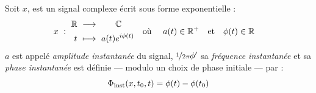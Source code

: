\begin{definition} \label{def:param_instant}
	Soit $x$, est un signal complexe écrit sous forme exponentielle :
	\begin{align}
		x\ &:\ \begin{aligned}\mathbb{R}\ &\longrightarrow\qquad \mathbb{C} \\
			t\ &\longmapsto\ a(t)e^{i\phi(t)}
		\end{aligned}  &  \text{où }\quad a(t)\in\mathbb{R}^+\quad &\text{et}\quad \phi(t)\in\mathbb{R}
	\end{align}
	$a$ est appelé \emph{amplitude instantanée} du signal, $\nicefrac{1}{2\pi}\phi'$ sa \emph{fréquence instantanée} et sa \emph{phase instantanée} est définie --- modulo un choix de phase initiale --- par :
	\begin{equation} \label{eq:phasei}
		\Phi_{\text{\normalfont inst}}(x,t_0,t) = \phi(t) - \phi(t_0)
	\end{equation}
\end{definition}
\skipl 

